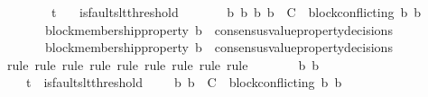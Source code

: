 \begin{isabellebody}
\ \ {\isachardoublequoteopen}{\isasymforall}\ {\isasymsigma}{}\ {\isasymsigma}{}{\isachardot}\ {\isacharbraceleft}{\isasymsigma}{}{\isacharcomma}\ {\isasymsigma}{}{\isacharbraceright}\ {\isasymsubseteq}\ {\isasymSigma}t\isanewline
\ \ {\isasymlongrightarrow}\ is{\isacharunderscore}faults{\isacharunderscore}lt{\isacharunderscore}threshold\ {\isacharparenleft}{\isasymsigma}{}\ {\isasymunion}\ {\isasymsigma}{}{\isacharparenright}\isanewline
\ \ {\isasymlongrightarrow}\ {\isacharparenleft}{\isasymforall}\ b{}\ b{}{\isachardot}\ {\isacharbraceleft}b{}{\isacharcomma}\ b{}{\isacharbraceright}\ {\isasymsubseteq}\ C\ {\isasymand}\ block{\isacharunderscore}conflicting\ {\isacharparenleft}b{}{\isacharcomma}\ b{}{\isacharparenright}\ \isanewline
\ \ \ \ \ \ {\isasymlongrightarrow}\ block{\isacharunderscore}membership{\isacharunderscore}property\ b{}\ {\isasymin}\ consensus{\isacharunderscore}value{\isacharunderscore}property{\isacharunderscore}decisions\ {\isasymsigma}{}\ \isanewline
\ \ \ \ \ \ {\isasymlongrightarrow}\ block{\isacharunderscore}membership{\isacharunderscore}property\ b{}\ {\isasymnotin}\ consensus{\isacharunderscore}value{\isacharunderscore}property{\isacharunderscore}decisions\ {\isasymsigma}{}{\isacharparenright}{\isachardoublequoteclose}\isanewline
%
\isadelimproof
\ \ %
\endisadelimproof
%
\isatagproof
{}\isamarkupfalse%
\ {\isacharparenleft}rule{\isacharcomma}\ rule{\isacharcomma}\ rule{\isacharcomma}\ rule{\isacharcomma}\ rule{\isacharcomma}\ rule{\isacharcomma}\ rule{\isacharcomma}\ rule{\isacharcomma}\ rule{\isacharparenright}\isanewline
{}\isamarkupfalse%
\ {\isacharminus}\isanewline
\ \ \isamarkupfalse%
\ {\isasymsigma}{}\ {\isasymsigma}{}\ b{}\ b{}\isanewline
\ \ \isamarkupfalse%
\ {\isachardoublequoteopen}{\isacharbraceleft}{\isasymsigma}{}{\isacharcomma}\ {\isasymsigma}{}{\isacharbraceright}\ {\isasymsubseteq}\ {\isasymSigma}t{\isachardoublequoteclose}\ \ {\isachardoublequoteopen}is{\isacharunderscore}faults{\isacharunderscore}lt{\isacharunderscore}threshold\ {\isacharparenleft}{\isasymsigma}{}\ {\isasymunion}\ {\isasymsigma}{}{\isacharparenright}{\isachardoublequoteclose}\ \ {\isachardoublequoteopen}{\isacharbraceleft}b{}{\isacharcomma}\ b{}{\isacharbraceright}\ {\isasymsubseteq}\ C\ {\isasymand}\ block{\isacharunderscore}conflicting\ {\isacharparenleft}b{}{\isacharcomma}\ b{}{\isacharparenright}{\isachardoublequoteclose}\ \isanewline

\end{isabellebody}
